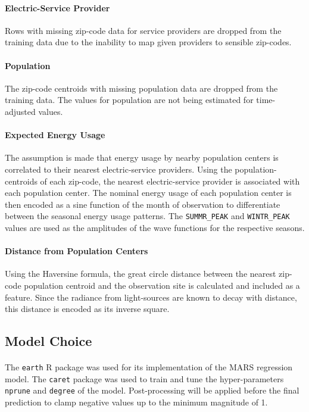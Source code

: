 \documentclass[11 pt]{article}  %
\begin{document}
\paragraph{Electric-Service Provider} Rows with missing zip-code data for service 
providers are dropped from the training data due to the inability to map given
providers to sensible zip-codes.

\paragraph{Population} The zip-code centroids with missing population data are
dropped from the training data. The values for population are not being estimated
for time-adjusted values.

\paragraph{Expected Energy Usage} The assumption is made that energy usage by
nearby population centers is correlated to their nearest electric-service providers.
Using the population-centroids of each zip-code, the nearest electric-service provider
is associated with each population center. The nominal energy usage of each population
center is then encoded as a sine function of the month of observation to differentiate
between the seasonal energy usage patterns. The \texttt{SUMMR\_PEAK} and \texttt{WINTR\_PEAK}
values are used as the amplitudes of the wave functions for the respective seasons.

\paragraph{Distance from Population Centers} Using the Haversine formula, the 
great circle distance between the nearest zip-code population centroid and the
observation site is calculated and included as a feature. Since the radiance from 
light-sources are known to decay with distance, this distance is encoded as 
its inverse square.

\subsection{Model Choice}
\paragraph{} The \texttt{earth} R package was used for its implementation of the
MARS regression model. The \texttt{caret} package was used to train and tune the
hyper-parameters \texttt{nprune} and \texttt{degree} of the model. Post-processing 
will be applied before the final prediction to clamp negative values up to the 
minimum magnitude of 1.
\end{document}
